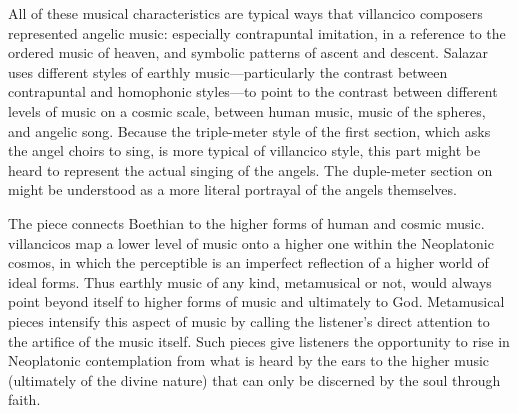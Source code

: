 

All of these musical characteristics are typical ways that villancico composers
represented angelic music: especially contrapuntal imitation, in a reference to
the ordered music of heaven, and symbolic patterns of ascent and descent.
Salazar uses different styles of earthly music---particularly the contrast
between contrapuntal and homophonic styles---to point to the contrast between
different levels of music on a cosmic scale, between human music, music of the
spheres, and angelic song.
Because the triple-meter style of the first section, which asks the angel
choirs to sing, is more typical of villancico style, this part might be heard
to represent the actual singing of the angels.
The duple-meter section on  might be understood as a more literal
portrayal of the angels themselves.

The piece connects Boethian  to the higher forms of
human and cosmic music. 
 villancicos map a lower level of music onto a higher one
within the Neoplatonic cosmos, in which the perceptible  is an imperfect reflection of a higher world of ideal forms.
Thus earthly music of any kind, metamusical or not, would always point beyond
itself to higher forms of music and ultimately to God.
Metamusical pieces intensify this aspect of music by calling the listener's
direct attention to the artifice of the music itself.
Such pieces give listeners the opportunity to rise in Neoplatonic contemplation
from what is heard by the ears to the higher music (ultimately of the divine
nature) that can only be discerned by the soul through faith.

